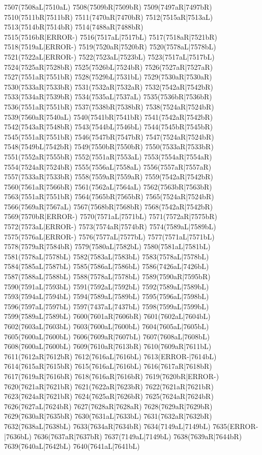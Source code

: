 7507(7508aL|7510aL) 7508(7509bR|7509bR) 7509(7497aR|7497bR) 7510(7511bR|7511bR) 7511(7470aR|7470bR) 7512(7515aR|7513aL) 7513(7514bR|7514bR) 7514(7488aR|7488bR) \\7515(7516bR|ERROR-) 7516(7517aL|7517bL) 7517(7518aR|7521bR) 7518(7519aL|ERROR-) 7519(7520aR|7520bR) 7520(7578aL|7578bL) 7521(7522aL|ERROR-) 7522(7523aL|7523bL) 7523(7517aL|7517bL) \\7524(7525aR|7528bR) 7525(7526bL|7524bR) 7526(7527aR|7527aR) 7527(7551aR|7551bR) 7528(7529bL|7531bL) 7529(7530aR|7530aR) 7530(7533aR|7533bR) 7531(7532aR|7532aR) 7532(7542aR|7542bR) \\7533(7534aR|7539bR) 7534(7535aL|7537aL) 7535(7536bR|7536bR) 7536(7551aR|7551bR) 7537(7538bR|7538bR) 7538(7524aR|7524bR) 7539(7560aR|7540aL) 7540(7541bR|7541bR) 7541(7542aR|7542bR) \\7542(7543aR|7548bR) 7543(7544bL|7546bL) 7544(7545bR|7545bR) 7545(7551aR|7551bR) 7546(7547bR|7547bR) 7547(7524aR|7524bR) 7548(7549bL|7542bR) 7549(7550bR|7550bR) 7550(7533aR|7533bR) \\7551(7552aR|7555bR) 7552(7551aR|7553aL) 7553(7554aR|7554aR) 7554(7524aR|7524bR) 7555(7556aL|7558aL) 7556(7557aR|7557aR) 7557(7533aR|7533bR) 7558(7559aR|7559aR) 7559(7542aR|7542bR) \\7560(7561aR|7566bR) 7561(7562aL|7564aL) 7562(7563bR|7563bR) 7563(7551aR|7551bR) 7564(7565bR|7565bR) 7565(7524aR|7524bR) 7566(7569aR|7567aL) 7567(7568bR|7568bR) 7568(7542aR|7542bR) \\7569(7570bR|ERROR-) 7570(7571aL|7571bL) 7571(7572aR|7575bR) 7572(7573aL|ERROR-) 7573(7574aR|7574bR) 7574(7589aL|7589bL) 7575(7576aL|ERROR-) 7576(7577aL|7577bL) 7577(7571aL|7571bL) \\7578(7579aR|7584bR) 7579(7580aL|7582bL) 7580(7581aL|7581bL) 7581(7578aL|7578bL) 7582(7583aL|7583bL) 7583(7578aL|7578bL) 7584(7585aL|7587bL) 7585(7586aL|7586bL) 7586(7426aL|7426bL) \\7587(7588aL|7588bL) 7588(7578aL|7578bL) 7589(7590aR|7595bR) 7590(7591aL|7593bL) 7591(7592aL|7592bL) 7592(7589aL|7589bL) 7593(7594aL|7594bL) 7594(7589aL|7589bL) 7595(7596aL|7598bL) \\7596(7597aL|7597bL) 7597(7437aL|7437bL) 7598(7599aL|7599bL) 7599(7589aL|7589bL) 7600(7601aR|7606bR) 7601(7602aL|7604bL) 7602(7603aL|7603bL) 7603(7600aL|7600bL) 7604(7605aL|7605bL) \\7605(7600aL|7600bL) 7606(7609aR|7607bL) 7607(7608aL|7608bL) 7608(7600aL|7600bL) 7609(7610aR|7613bR) 7610(7609aR|7611bL) 7611(7612aR|7612bR) 7612(7616aL|7616bL) 7613(ERROR-|7614bL) \\7614(7615aR|7615bR) 7615(7616aL|7616bL) 7616(7617aR|7618bR) 7617(7619aR|7616bR) 7618(7616aR|7616bR) 7619(7620bR|ERROR-) 7620(7621aR|7621bR) 7621(7622aR|7623bR) 7622(7621aR|7621bR) \\7623(7624aR|7621bR) 7624(7625aR|7626bR) 7625(7624aR|7624bR) 7626(7627aL|7624bR) 7627(7628aR|7628aR) 7628(7629aR|7629bR) 7629(7630aR|7635bR) 7630(7631aL|7633bL) 7631(7632aR|7632bR) \\7632(7638aL|7638bL) 7633(7634aR|7634bR) 7634(7149aL|7149bL) 7635(ERROR-|7636bL) 7636(7637aR|7637bR) 7637(7149aL|7149bL) 7638(7639aR|7644bR) 7639(7640aL|7642bL) 7640(7641aL|7641bL) 
